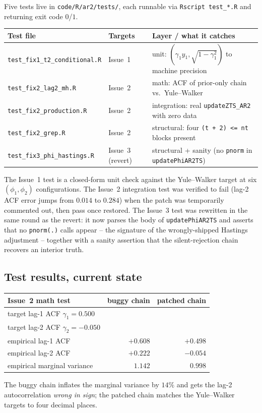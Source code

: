 \documentclass[11pt]{article}
\theoremstyle{plain}
\theoremstyle{definition}
\theoremstyle{remark}
\begin{document}
Five tests live in \texttt{code/R/ar2/tests/}, each runnable via
\texttt{Rscript test\_*.R} and returning exit code $0$/$1$.
\begin{center}
\begin{tabular}{lll}
\toprule
\textbf{Test file}                          & \textbf{Targets} & \textbf{Layer / what it catches} \\
\midrule
\texttt{test\_fix1\_t2\_conditional.R}      & Issue~1          & unit: $(\gamma_1 y_1, \sqrt{1 - \gamma_1^2})$ to machine precision \\
\texttt{test\_fix2\_lag2\_mh.R}             & Issue~2          & math: ACF of prior-only chain vs.\ Yule--Walker \\
\texttt{test\_fix2\_production.R}           & Issue~2          & integration: real \texttt{updateZTS\_AR2} with zero data \\
\texttt{test\_fix2\_grep.R}                 & Issue~2          & structural: four \texttt{(t + 2) <= nt} blocks present \\
\texttt{test\_fix3\_phi\_hastings.R}        & Issue~3 (revert) & structural + sanity (no \texttt{pnorm} in \texttt{updatePhiAR2TS}) \\
\bottomrule
\end{tabular}
\end{center}
The Issue~1 test is a closed-form unit check against the Yule--Walker
target at six $(\phi_1, \phi_2)$ configurations. The Issue~2 integration
test was verified to fail (lag-2 ACF error jumps from $0.014$ to $0.284$)
when the patch was temporarily commented out, then pass once restored.
The Issue~3 test was rewritten in the same round as the revert: it now
parses the body of \texttt{updatePhiAR2TS} and asserts that no
\texttt{pnorm(.)} calls appear -- the signature of the wrongly-shipped
Hastings adjustment -- together with a sanity assertion that the
silent-rejection chain recovers an interior truth.

\subsection{Test results, current state}\label{sec:test-results}

\begin{center}
\begin{tabular}{lrr}
\toprule
\textbf{Issue~2 math test} & buggy chain & patched chain \\
\midrule
target lag-1 ACF $\gamma_1 = 0.500$       &           &           \\
target lag-2 ACF $\gamma_2 = -0.050$      &           &           \\
empirical lag-1 ACF                       & $+0.608$  & $+0.498$  \\
empirical lag-2 ACF                       & $+0.222$  & $-0.054$  \\
empirical marginal variance               & $1.142$   & $0.998$   \\
\bottomrule
\end{tabular}
\end{center}
The buggy chain inflates the marginal variance by $14\%$ and gets the
lag-2 autocorrelation \emph{wrong in sign}; the patched chain matches the
Yule--Walker targets to four decimal places.
\end{document}
